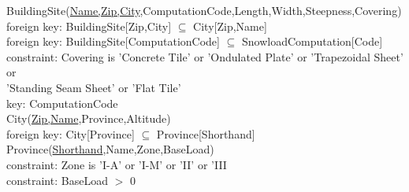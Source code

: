 \documentclass{article}[h]
\begin{document}
{{{{\color{ForestGreen}BuildingSite(\underline{Name,Zip,City},ComputationCode,Length,Width,Steepness,Covering)}\\
{\color{Orange}\hspace{2mm} foreign key: {\color{Magenta}BuildingSite[Zip,City] $\subseteq$ City[Zip,Name]}} \\
{\color{Orange}\hspace{2mm} foreign key: {\color{Magenta}BuildingSite[ComputationCode] $\subseteq$ SnowloadComputation[Code]}} \\
{\color{Orange}\hspace{2mm} constraint: {\color{Magenta}Covering is 'Concrete Tile' or 'Ondulated Plate' or 'Trapezoidal Sheet' or}} \\
{\color{Magenta}\hspace{19.5mm}'Standing Seam Sheet' or 'Flat Tile'}}\\
{\color{Orange}\hspace{2mm} key: {\color{Magenta}ComputationCode}} \\

{\color{ForestGreen}City(\underline{Zip,Name},Province,Altitude)}\\
{\color{Orange}\hspace{2mm} foreign key: {\color{Magenta}City[Province] $\subseteq$ Province[Shorthand]}} \\

{\color{ForestGreen}Province(\underline{Shorthand},Name,Zone,BaseLoad)}\\
{\color{Orange}\hspace{2mm} constraint: {\color{Magenta}Zone is 'I-A' or 'I-M' or 'II' or 'III}} \\
{\color{Orange}\hspace{2mm} constraint: {\color{Magenta}BaseLoad $>$ 0}} \\

\vspace{12px}

}}
\end{document}

